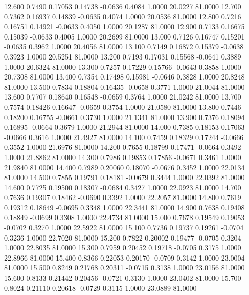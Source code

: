   12.600   0.7490   0.17053   0.14738  -0.0636   0.4084   1.0000  20.0227  81.0000
  12.700   0.7362   0.16937   0.14839  -0.0635   0.4074   1.0000  20.0536  81.0000
  12.800   0.7216   0.16751   0.14921  -0.0633   0.4050   1.0000  20.1287  81.0000
  12.900   0.7133   0.16675   0.15039  -0.0633   0.4005   1.0000  20.2699  81.0000
  13.000   0.7126   0.16747   0.15201  -0.0635   0.3962   1.0000  20.4056  81.0000
  13.100   0.7149   0.16872   0.15379  -0.0638   0.3923   1.0000  20.5251  81.0000
  13.200   0.7193   0.17031   0.15568  -0.0641   0.3889   1.0000  20.6324  81.0000
  13.300   0.7257   0.17229   0.15766  -0.0643   0.3858   1.0000  20.7308  81.0000
  13.400   0.7354   0.17498   0.15981  -0.0646   0.3828   1.0000  20.8248  81.0000
  13.500   0.7834   0.18804   0.16435  -0.0658   0.3771   1.0000  21.0044  81.0000
  13.600   0.7707   0.18640   0.16548  -0.0659   0.3764   1.0000  21.0242  81.0000
  13.700   0.7574   0.18426   0.16647  -0.0659   0.3754   1.0000  21.0580  81.0000
  13.800   0.7446   0.18200   0.16755  -0.0661   0.3730   1.0000  21.1341  81.0000
  13.900   0.7376   0.18094   0.16895  -0.0664   0.3679   1.0000  21.2944  81.0000
  14.000   0.7385   0.18153   0.17063  -0.0666   0.3616   1.0000  21.4927  81.0000
  14.100   0.7459   0.18329   0.17244  -0.0666   0.3552   1.0000  21.6976  81.0000
  14.200   0.7655   0.18799   0.17471  -0.0664   0.3492   1.0000  21.8862  81.0000
  14.300   0.7986   0.19853   0.17856  -0.0671   0.3461   1.0000  21.9840  81.0000
  14.400   0.7989   0.20060   0.18070  -0.0676   0.3452   1.0000  22.0134  81.0000
  14.500   0.7855   0.19791   0.18181  -0.0679   0.3444   1.0000  22.0392  81.0000
  14.600   0.7725   0.19500   0.18307  -0.0684   0.3427   1.0000  22.0923  81.0000
  14.700   0.7636   0.19307   0.18462  -0.0690   0.3392   1.0000  22.2057  81.0000
  14.800   0.7619   0.19312   0.18649  -0.0695   0.3348   1.0000  22.3441  81.0000
  14.900   0.7638   0.19408   0.18849  -0.0699   0.3308   1.0000  22.4734  81.0000
  15.000   0.7678   0.19549   0.19053  -0.0702   0.3270   1.0000  22.5922  81.0000
  15.100   0.7736   0.19737   0.19261  -0.0704   0.3236   1.0000  22.7020  81.0000
  15.200   0.7822   0.20002   0.19477  -0.0705   0.3204   1.0000  22.8035  81.0000
  15.300   0.7959   0.20452   0.19718  -0.0705   0.3175   1.0000  22.8966  81.0000
  15.400   0.8366   0.22053   0.20170  -0.0709   0.3142   1.0000  23.0004  81.0000
  15.500   0.8249   0.21768   0.20311  -0.0715   0.3138   1.0000  23.0156  81.0000
  15.600   0.8133   0.21442   0.20456  -0.0721   0.3130   1.0000  23.0402  81.0000
  15.700   0.8024   0.21110   0.20618  -0.0729   0.3115   1.0000  23.0889  81.0000
